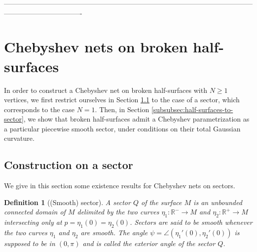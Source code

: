 \documentclass{article}
\newcommand{\R}{\mathbb{R}}
\newcommand{\surf}{M}
\newcommand{\sect}{Q}
\newtheorem{definitionE}[theorem]{Definition}
\theoremstyle{remark}
\theoremstyle{prpart}
\begin{document}
----------------------------------------------------------------------------------------------------------------------------------------------


\section{Chebyshev nets on broken half-surfaces} \label{subsec:Nhalf-surfaces}
In order to construct a Chebyshev net on broken half-surfaces with $N\geq1$ vertices, we first restrict ourselves in Section \ref{subsubsec:cheb-sector} to the case of a sector, which corresponds to the case $N=1$. Then, in Section \ref{subsubsec:half-surfaces-to-sector}, we show that broken half-surfaces admit a Chebyshev parametrization as a particular piecewise smooth sector, under conditions on their total Gaussian curvature.

\subsection{Construction on a sector}\label{subsubsec:cheb-sector}
We give in this section some existence results for Chebyshev nets on sectors.
\begin{definitionE}[(Smooth) sector]\label{def:sector}
  A \emph{sector} $\sect$ of the surface $\surf$ is an unbounded connected domain of $\surf$ delimited by the two curves $\eta_1 : \R^-\to \surf$ and $\eta_2 : \R^+\to\surf$ intersecting only at $p=\eta_1(0)=\eta_2(0)$. \emph{Sectors} are said to be smooth whenever the two curves $\eta_1$ and $\eta_2$ are smooth. The angle $\psi = \angle(\eta_1'(0), \eta_2'(0))$ is supposed to be in $(0,\pi)$ and is called the exterior angle of the \emph{sector} $\sect$.
\end{definitionE}
\end{document}
